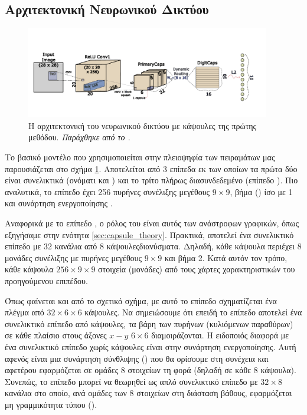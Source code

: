 \subsection{Αρχιτεκτονική Νευρωνικού Δικτύου}

\begin{figure}[h]
    \centering
    \includegraphics[width=0.95\textwidth]{images/chapter method/first_method_architecture_encoder.pdf}
    \caption{Η αρχιτεκτονική του νευρωνικού δικτύου με κάψουλες της πρώτης μεθόδου. \textit{Παράχθηκε από το \href{https://inkscape.org/}{}}.}
    \label{fig:method_1_architecture}
  \end{figure}

Το βασικό μοντέλο που χρησιμοποιείται στην πλειοψηφία των πειραμάτων μας παρουσιάζεται στο σχήμα \ref{fig:method_1_architecture}. Αποτελείται από 3 επίπεδα εκ των οποίων τα πρώτα δύο είναι συνελικτικά (ονόματι  και ) και το τρίτο πλήρως διασυνδεδεμένο (επίπεδο ). Πιο αναλυτικά, το επίπεδο  έχει 256 πυρήνες συνέλιξης μεγέθους $9 \times 9$, βήμα () ίσο με 1 και συνάρτηση ενεργοποίησης .\par

Αναφορικά με το επίπεδο , ο ρόλος του είναι αυτός των ανάστροφων γραφικών, όπως εξηγήσαμε στην ενότητα \ref{sec:capsule_theory}. Πρακτικά, αποτελεί ένα συνελικτικό επίπεδο με 32 κανάλια από 8 κάψουλες\textendash διανύσματα. Δηλαδή, κάθε κάψουλα περιέχει 8 μονάδες συνέλιξης με πυρήνες μεγέθους $9 \times 9$ και βήμα 2. Κατά αυτόν τον τρόπο, κάθε κάψουλα  $256 \times 9 \times 9$ στοιχεία (μονάδες) από τους χάρτες χαρακτηριστικών του προηγούμενου επιπέδου.\par

Όπως φαίνεται και από το σχετικό σχήμα, με αυτό το επίπεδο σχηματίζεται ένα πλέγμα από $32 \times 6 \times 6$ κάψουλες. Να σημειώσουμε ότι επειδή το επίπεδο  αποτελεί ένα συνελικτικό επίπεδο από κάψουλες, τα βάρη των πυρήνων (κυλιόμενων παραθύρων) σε κάθε πλαίσιο στους άξονες $x-y$ $6 \times 6$ διαμοιράζονται. Η ειδοποιός διαφορά με ένα συνελικτικό επίπεδο χωρίς κάψουλες είναι στην συνάρτηση ενεργοποίησης. Αυτή αφενός είναι μια συνάρτηση σύνθλιψης () που θα ορίσουμε στη συνέχεια και αφετέρου εφαρμόζεται σε ομάδες 8 στοιχείων τη φορά (δηλαδή σε κάθε 8 κάψουλα). Συνεπώς, το επίπεδο  μπορεί να θεωρηθεί ως απλό συνελικτικό επίπεδο με $32 \times 8$ κανάλια στο οποίο, ανά ομάδες των 8 στοιχείων στη διάσταση βάθους, εφαρμόζεται μη γραμμικότητα τύπου  ().\par

